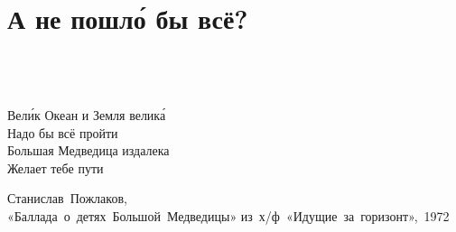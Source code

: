 \chapter{А не пошл\'{о} бы всё?} 

\epigraph{%
	~\\
	~\\	
	~\\	
	Вел\'{и}к Океан и Земля велик\'{а} \\
	Надо бы всё пройти \\
	Большая Медведица издалека \\
	Желает тебе пути}
	{
	\begin{flushright}
		\small{Станислав~Пожлаков,\\«Баллада~о~детях~Большой~Медведицы» из~х/ф~«Идущие~за~горизонт»,~1972}
	\end{flushright}
	}

